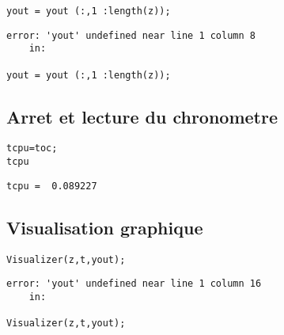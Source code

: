 \documentclass[10pt]{article}
\begin{document}
\begin{lstlisting}
yout = yout (:,1 :length(z));
\end{lstlisting}
\begin{lstlisting}[language={},xleftmargin=5pt,frame=none]
error: 'yout' undefined near line 1 column 8
	in:

yout = yout (:,1 :length(z));

\end{lstlisting}


{}
\subsection*{Arret et lecture du chronometre}

\begin{lstlisting}
tcpu=toc;
tcpu
\end{lstlisting}
\begin{lstlisting}[language={},xleftmargin=5pt,frame=none]
tcpu =  0.089227

\end{lstlisting}


{}
\subsection*{Visualisation graphique}

\begin{lstlisting}
Visualizer(z,t,yout);
\end{lstlisting}
\begin{lstlisting}[language={},xleftmargin=5pt,frame=none]
error: 'yout' undefined near line 1 column 16
	in:

Visualizer(z,t,yout);




\end{lstlisting}
\end{document}
